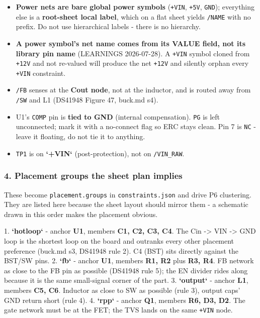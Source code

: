 \documentclass[11pt,a4paper]{article}
\begin{document}
\begin{itemize}
\item \textbf{Power nets are bare global power symbols} (\texttt{+VIN}, \texttt{+5V}, \texttt{GND}); everything
else is a \textbf{root-sheet local label}, which on a flat sheet yields \texttt{/NAME} with no
prefix. Do not use hierarchical labels - there is no hierarchy.
\item \textbf{A power symbol's net name comes from its VALUE field, not its library pin name}
(LEARNINGS 2026-07-28). A \texttt{+VIN} symbol cloned from \texttt{+12V} and not re-valued will
produce the net \texttt{+12V} and silently orphan every \texttt{+VIN} constraint.
\item \texttt{/FB} senses at the \textbf{Cout node}, not at the inductor, and is routed away from
\texttt{/SW} and L1 (DS41948 Figure 47, buck.md s4).
\item U1's \texttt{COMP} pin is \textbf{tied to GND} (internal compensation). \texttt{PG} is left
unconnected; mark it with a no-connect flag so ERC stays clean. Pin 7 is \texttt{NC} -
leave it floating, do not tie it to anything.
\item \texttt{TP1} is on \textbf{`+VIN`} (post-protection), not on \texttt{/VIN\_RAW}.
\end{itemize}
\subsubsection*{4. Placement groups the sheet plan implies}
These become \texttt{placement.groups} in \texttt{constraints.json} and drive P6 clustering. They are listed here because the sheet layout should mirror them - a schematic drawn in this order makes the placement obvious.

1. \textbf{`hotloop`} - anchor \textbf{U1}, members \textbf{C1, C2, C3, C4}. The Cin -\textgreater{} VIN -\textgreater{} GND loop is the shortest loop on the board and outranks every other placement preference (buck.md s3, DS41948 rule 2). C4 (BST) sits directly against the BST/SW pins. 2. \textbf{`fb`} - anchor \textbf{U1}, members \textbf{R1, R2} plus \textbf{R3, R4}. FB network as close to the FB pin as possible (DS41948 rule 5); the EN divider rides along because it is the same small-signal corner of the part. 3. \textbf{`output`} - anchor \textbf{L1}, members \textbf{C5, C6}. Inductor as close to SW as possible (rule 3), output caps' GND return short (rule 4). 4. \textbf{`rpp`} - anchor \textbf{Q1}, members \textbf{R6, D3, D2}. The gate network must be at the FET; the TVS lands on the same \texttt{+VIN} node.
\end{document}
